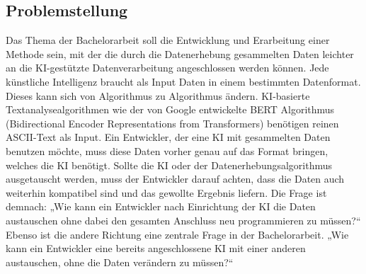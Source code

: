 \subsection{Problemstellung}
Das Thema der Bachelorarbeit soll die Entwicklung und Erarbeitung einer Methode sein,
mit der die durch die Datenerhebung gesammelten Daten leichter an die KI-gestützte
Datenverarbeitung angeschlossen werden können. Jede künstliche Intelligenz braucht
als Input Daten in einem bestimmten Datenformat. Dieses kann sich von Algorithmus zu
Algorithmus ändern. KI-basierte Textanalysealgorithmen wie der von Google entwickelte
BERT Algorithmus (Bidirectional Encoder Representations from Transformers) benötigen
reinen ASCII-Text als Input. Ein Entwickler, der eine KI mit gesammelten Daten benutzen
möchte, muss diese Daten vorher genau auf das Format bringen, welches die KI benötigt.
Sollte die KI oder der Datenerhebungsalgorithmus ausgetauscht werden, muss der Entwickler
darauf achten, dass die Daten auch weiterhin kompatibel sind und das gewollte
Ergebnis liefern. Die Frage ist demnach: „Wie kann ein Entwickler nach Einrichtung der
KI die Daten austauschen ohne dabei den gesamten Anschluss neu programmieren zu
müssen?“ Ebenso ist die andere Richtung eine zentrale Frage in der Bachelorarbeit. „Wie
kann ein Entwickler eine bereits angeschlossene KI mit einer anderen austauschen, ohne
die Daten verändern zu müssen?“

